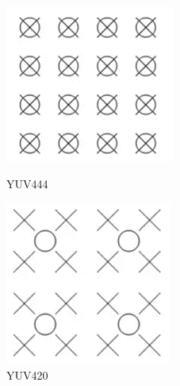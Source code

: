 \documentclass{article}
\begin{document}
\begin{figure}[htbp]
    \centering
    \begin{minipage}[t]{0.45\textwidth}
        \centering
        \includegraphics[width=\textwidth]{assets/YUV444.png}
        \caption{YUV444}
        \label{fig:example1}
    \end{minipage}
    \hfill  %
    \begin{minipage}[t]{0.45\textwidth}
        \centering
        \includegraphics[width=\textwidth]{assets/YUV420.png}
        \caption{YUV420}
        \label{fig:example2}
    \end{minipage}
\end{figure}
\end{document}
